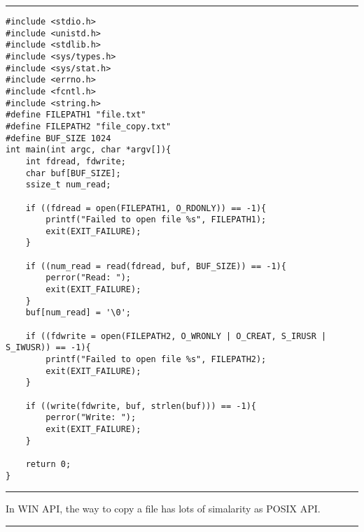 \documentclass[letterpaper,12pt,titlepage]{article}
\begin{document}
\noindent\rule{15.5cm}{0.4pt}
\begin{verbatim}
#include <stdio.h>
#include <unistd.h>
#include <stdlib.h>
#include <sys/types.h>
#include <sys/stat.h>
#include <errno.h>
#include <fcntl.h>
#include <string.h>
#define FILEPATH1 "file.txt"
#define FILEPATH2 "file_copy.txt"
#define BUF_SIZE 1024
int main(int argc, char *argv[]){
    int fdread, fdwrite;
    char buf[BUF_SIZE];
    ssize_t num_read;
    
    if ((fdread = open(FILEPATH1, O_RDONLY)) == -1){
        printf("Failed to open file %s", FILEPATH1);
        exit(EXIT_FAILURE);
    }
    
    if ((num_read = read(fdread, buf, BUF_SIZE)) == -1){
        perror("Read: ");
        exit(EXIT_FAILURE);
    }
    buf[num_read] = '\0';
    
    if ((fdwrite = open(FILEPATH2, O_WRONLY | O_CREAT, S_IRUSR | S_IWUSR)) == -1){
        printf("Failed to open file %s", FILEPATH2);
        exit(EXIT_FAILURE);
    }
    
    if ((write(fdwrite, buf, strlen(buf))) == -1){
        perror("Write: ");
        exit(EXIT_FAILURE);
    }
    
    return 0;
}
\end{verbatim}
\noindent\rule{15.5cm}{0.4pt}
In WIN API, the way to copy a file has lots of simalarity as POSIX API. \par
\noindent\rule{15.5cm}{0.4pt}
\end{document}
